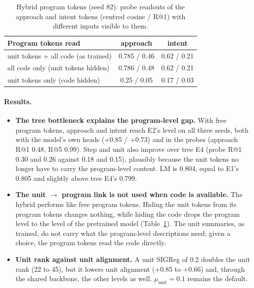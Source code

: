 \documentclass[11pt]{article}
\begin{document}
\begin{table}[h]
\centering
\small
\caption{Hybrid program tokens (seed 82): probe readouts of the approach and intent tokens (centred cosine / R@1)
with different inputs visible to them.}
\label{tab:hybrid}
\begin{tabular}{@{}l c c@{}}
\toprule
Program tokens read & approach & intent \\
\midrule
unit tokens + all code (as trained) & 0.785 / 0.46 & 0.62 / 0.21 \\
all code only (unit tokens hidden) & 0.786 / 0.48 & 0.62 / 0.21 \\
unit tokens only (code hidden) & 0.25 / 0.05 & 0.17 / 0.03 \\
\bottomrule
\end{tabular}
\end{table}

\paragraph{Results.}
\begin{itemize}
  \item \textbf{The tree bottleneck explains the program-level gap.} With free program tokens, approach and intent
        reach E2's level on all three seeds, both with the model's own heads (+0.85 / +0.73) and in the probes
        (approach R@1 0.48, R@5 0.99). Step and unit also improve over tree E4 (probe R@1 0.30 and 0.26 against
        0.18 and 0.15), plausibly because the unit tokens no longer have to carry the program-level content. LM is
        0.804, equal to E1's 0.805 and slightly above tree E4's 0.799.
  \item \textbf{The unit $\to$ program link is not used when code is available.} The hybrid performs like free
        program tokens. Hiding the unit tokens from its program tokens changes nothing, while hiding the code drops
        the program level to the level of the pretrained model (Table~\ref{tab:hybrid}). The unit summaries, as
        trained, do not carry what the program-level descriptions need; given a choice, the program tokens read
        the code directly.
  \item \textbf{Unit rank against unit alignment.} A unit SIGReg of 0.2 doubles the unit rank (22 to 45), but it
        lowers unit alignment (+0.85 to +0.66) and, through the shared backbone, the other levels as well.
        $\mu_{\text{unit}}=0.1$ remains the default.
\end{itemize}
\end{document}
